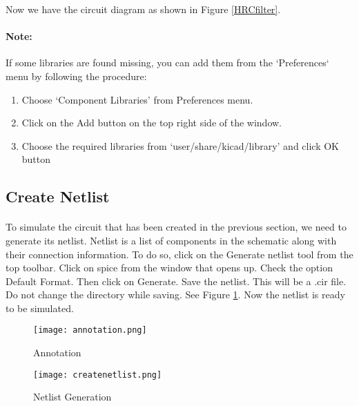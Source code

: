 Now we have the circuit diagram as shown in Figure \ref{HRCfilter}.


\paragraph{Note:} If some libraries are found missing, you can add them from the `Preferences` menu by following the procedure: 

\begin{enumerate}
\item
Choose `Component Libraries' from Preferences menu.

\item
Click on the Add button on the top right side of the window.

\item
Choose the required libraries from `user/share/kicad/library' and click OK button

\end{enumerate}

\subsection*{Create Netlist}

\paragraph{}To simulate the circuit that has been created in the previous section, we need to generate
its netlist. Netlist is a list of components in the schematic along with their connection
information. To do so, click on the Generate netlist tool from the top toolbar. Click on
spice from the window that opens up. Check the option Default Format. Then click
on Generate. Save the netlist. This will be a .cir file. Do
not change the directory while saving. See Figure \ref{createnetlist5}.
 Now the netlist is ready to be simulated. 
\begin{figure}
\begin{minipage}{.5\textwidth}
  \centering
  \texttt{[image: annotation.png]}
  \caption{Annotation}
  \label{annotation5}
\end{minipage}%
\begin{minipage}{.5\textwidth}
  \centering
  \texttt{[image: createnetlist.png]}
  \caption{Netlist Generation}
  \label{createnetlist5}
\end{minipage}
\end{figure}

